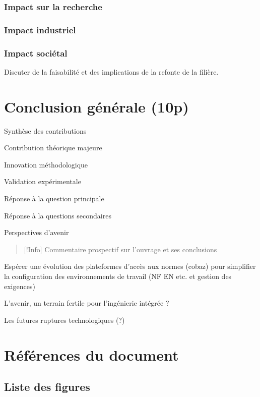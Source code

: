 \documentclass[a4paper,12pt]{article}
\begin{document}
\subsubsection{Impact sur la recherche}
\label{sec:org8030f15}
\subsubsection{Impact industriel}
\label{sec:org5e541c0}
\subsubsection{Impact sociétal}
\label{sec:org66b2256}
Discuter de la faisabilité et des implications de la refonte de la filière.
\clearpage
\section{Conclusion générale (10p)}
\label{sec:orga2a2068}
Synthèse des contributions

Contribution théorique majeure

Innovation méthodologique

Validation expérimentale

Réponse à la question principale

Réponse à la questions secondaires

Perspectives d'avenir


\begin{quote}
{[}!Info] Commentaire prospectif sur l'ouvrage et ses conclusions
\end{quote}

Espérer une évolution des plateformes d'accès aux normes (cobaz) pour simplifier la configuration des environnements de travail (NF EN etc. et gestion des exigences)

L'avenir, un terrain fertile pour l'ingénierie intégrée ?

Les futures ruptures technologiques (?)
\clearpage

\clearpage
\section{Références du document}
\label{sec:org48cec11}
\subsection{Liste des figures}
\label{sec:org5d77b04}
\renewcommand{\listfigurename}{\vspace{-2em}}
\listoffigures
\end{document}
